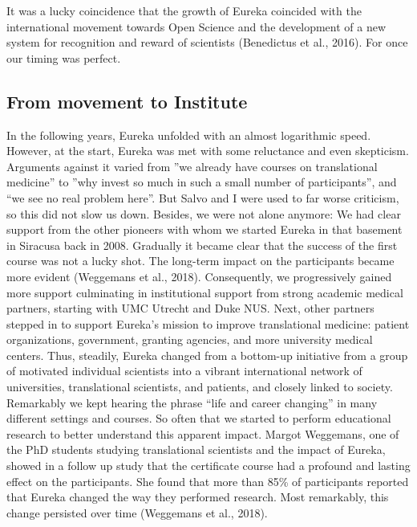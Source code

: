\documentclass[authordate, editorial]{jote-new-article}
\begin{document}
	It was a lucky coincidence that the growth of Eureka coincided with the international movement towards Open Science and the development of a new system for recognition and reward of scientists (Benedictus et al., 2016). For once our timing was perfect.







	\subsection{From movement to Institute}



	In the following years, Eureka unfolded with an almost logarithmic speed. However, at the start, Eureka was met with some reluctance and even skepticism. Arguments against it varied from ”we already have courses on translational medicine” to ”why invest so much in such a small number of participants”, and “we see no real problem here”. But Salvo and I were used to far worse criticism, so this did not slow us down. Besides, we were not alone anymore: We had clear support from the other pioneers with whom we started Eureka in that basement in Siracusa back in 2008. Gradually it became clear that the success of the first course was not a lucky shot. The long-term impact on the participants became more evident (Weggemans et al., 2018). Consequently, we progressively gained more support culminating in institutional support from strong academic medical partners, starting with UMC Utrecht and Duke NUS. Next, other partners stepped in to support Eureka's mission to improve translational medicine: patient organizations, government, granting agencies, and more university medical centers. Thus, steadily, Eureka changed from a bottom-up initiative from a group of motivated individual scientists into a vibrant international network of universities, translational scientists, and patients, and closely linked to society. Remarkably we kept hearing the phrase “life and career changing” in many different settings and courses. So often that we started to perform educational research to better understand this apparent impact. Margot Weggemans, one of the PhD students studying translational scientists and the impact of Eureka, showed in a follow up study that the certificate course had a profound and lasting effect on the participants. She found that more than 85\% of participants reported that Eureka changed the way they performed research. Most remarkably, this change persisted over time (Weggemans et al., 2018).
\end{document}
